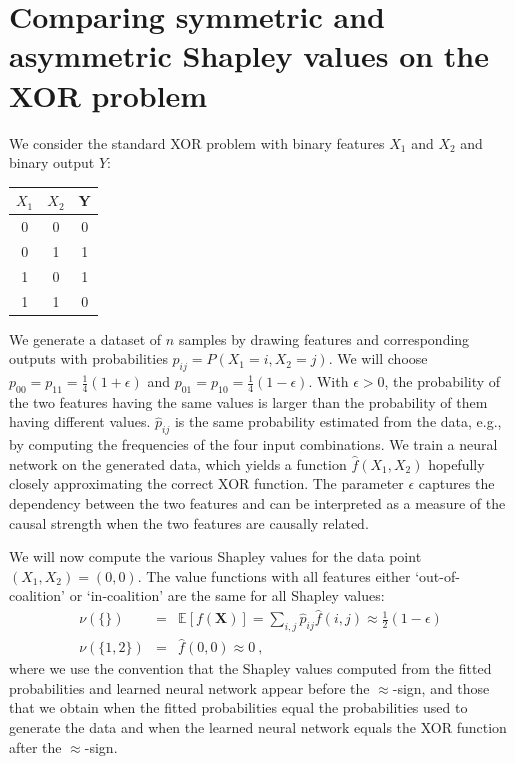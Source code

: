\documentclass{article}
\newcommand{\vX}{\mathbf{X}}
\newcommand{\expectation}{\mathbb{E}}
\begin{document}
\section{Comparing symmetric and asymmetric Shapley values on the XOR problem}

We consider the standard XOR problem with binary features $X_1$ and $X_2$ and binary output $Y$:
\begin{center}
\begin{tabular}{cc|c}
	$X_1$ & $X_2$ & Y \\ \hline
	0     & 0     & 0 \\
	0     & 1     & 1 \\
	1     & 0     & 1 \\
	1     & 1     & 0
\end{tabular}
\end{center}
We generate a dataset of $n$ samples by drawing features and corresponding outputs with probabilities $p_{ij} = P(X_1=i,X_2=j)$. We will choose $p_{00} = p_{11} = \frac{1}{4} (1 + \epsilon)$ and $p_{01} = p_{10} = \frac{1}{4} (1 - \epsilon)$. With $\epsilon > 0$, the probability of the two features having the same values is larger than the probability of them having different values. $\hat{p}_{ij}$ is the same probability estimated from the data, e.g., by computing the frequencies of the four input combinations. We train a neural network on the generated data, which yields a function $\hat{f}(X_1,X_2)$ hopefully closely approximating the correct XOR function. The parameter $\epsilon$ captures the dependency between the two features and can be interpreted as a measure of the causal strength when the two features are causally related.

We will now compute the various Shapley values for the data point $(X_1,X_2) = (0,0)$. The value functions with all features either `out-of-coalition' or `in-coalition' are the same for all Shapley values:
\begin{eqnarray*}
\nu(\{\}) & = & \expectation\left[f(\vX)\right] = \sum_{i,j} \hat{p}_{ij} \hat{f}(i,j) \approx \frac{1}{2} (1 - \epsilon) \\
\nu(\{1,2\}) & = & \hat{f}(0,0) \approx 0 \: ,
\end{eqnarray*}
where we use the convention that the Shapley values computed from the fitted probabilities and learned neural network appear before the $\approx$-sign, and those that we obtain when the fitted probabilities equal the probabilities used to generate the data and when the learned neural network equals the XOR function after the $\approx$-sign.
\end{document}
